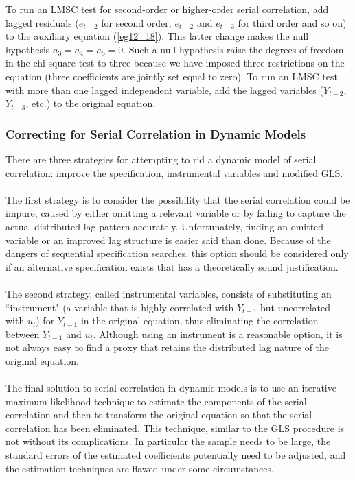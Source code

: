 \documentclass[11pt]{article}
\begin{document}
To run an LMSC test for second-order or higher-order serial correlation, add lagged residuals ($e_{t-2}$ for second order, $e_{t-2}$ and $e_{t-3}$ for third order and so on) to the auxiliary equation (\ref{eg12_18}). This latter change makes the null hypothesis $a_3 = a_4 = a_5 = 0$. Such a null hypothesis raise the degrees of freedom in the chi-square test to three because we have imposed three restrictions on the equation (three coefficients are jointly set equal to zero). To run an LMSC test with more than one lagged independent variable, add the lagged variables ($Y_{t-2}$, $Y_{t-3}$, etc.) to the original equation.
\subsubsection{Correcting for Serial Correlation in Dynamic Models}
There are three strategies for attempting to rid a dynamic model of serial correlation: improve the specification, instrumental variables and modified GLS.\\ \\
The first strategy is to consider the possibility that the serial correlation could be impure, caused by either omitting a relevant variable or by failing to capture the actual distributed lag pattern accurately. Unfortunately, finding an omitted variable or an improved lag structure is easier said than done. Because of the dangers of sequential specification searches, this option should be considered only if an alternative specification exists that has a theoretically sound justification.\\ \\
The second strategy, called instrumental variables, consists of substituting an ``instrument" (a variable that is highly correlated with $Y_{t-1}$ but uncorrelated with $u_t$) for $Y_{t-1}$ in the original equation, thus eliminating the correlation between $Y_{t-1}$ and $u_t$. Although using an instrument is a reasonable option, it is not always easy to find a proxy that retains the distributed lag nature of the original equation.\\ \\
The final solution to serial correlation in dynamic models is to use an iterative maximum likelihood technique to estimate the components of the serial correlation and then to transform the original equation so that the serial correlation has been eliminated. This technique, similar to the GLS procedure is not without its complications. In particular the sample needs to be large, the standard errors of the estimated coefficients potentially need to be adjusted, and the estimation techniques are flawed under some circumstances.
\end{document}
